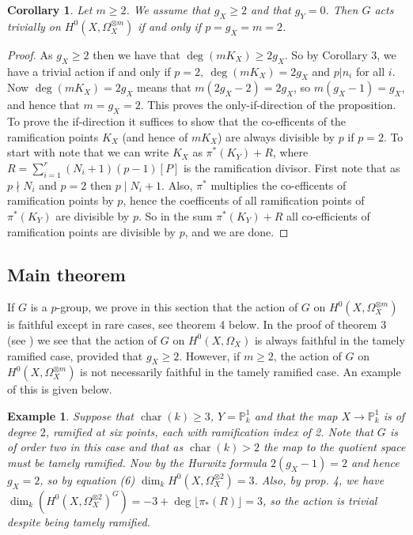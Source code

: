\documentclass[11pt]{article} %
\newtheorem{cor}{Corollary}
\newtheorem{ex}{Example}
\DeclareMathOperator{\cha}{char}
\begin{document}
\begin{cor}
Let $m\geq 2$. We assume that $g_X\geq 2$ and that $g_Y=0$. Then $G$ acts trivially on $H^0(X,\Omega_X^{\otimes m})$ if 
and only if $p=g_X=m=2$.
\end{cor}
\begin{proof}

As $g_X\geq 2$ then we have that $\deg(mK_X)\geq 2g_X$. So by Corollary 3, we have a trivial action if and only if $p=2,\ \deg(mK_X)=2g_X$ and $p|n_i$ for all $i$. Now $\deg(mK_X)=2g_X$ means that $m(2g_X-2)=2g_X$, so $m(g_X-1)=g_X$, and hence that $m=g_X=2$. This proves the only-if-direction of the proposition. To prove the if-direction it suffices to show that the co-efficents of the ramification points $K_X$ (and hence of $mK_X$) are always divisible by $p$ if $p=2$. To start with note that we can write $K_X$ as $\pi^*(K_Y)+R$, where $R=\sum_{i=1}^r(N_i+1)(p-1)[P]$ is the ramification divisor. First note that as $p\nmid N_i$ and $p=2$ then $p\mid N_i+1$. Also, $\pi^*$ multiplies the co-efficents of ramification points by $p$, hence the coefficents of all ramification points of $\pi^*(K_Y)$ are divisible by $p$. So in the sum $\pi^*(K_Y)+R$ all co-efficients of ramification points are divisible by $p$, and we are done.
\end{proof}

\subsection{Main theorem}

If $G$ is a $p$-group, we prove in this section that the action of $G$ on $H^0(X,\Omega_X^{\otimes m})$ is faithful 
except in rare cases, see theorem 4 below. In the proof of theorem 3 (see \citep{faithfulaction}) we see that the action of 
$G$ on $H^0(X,\Omega_X)$ is always faithful in the tamely ramified case, provided that $g_X\geq2$. However, if $m\geq 2$, 
the action of $G$ on $H^0(X,\Omega_X^{\otimes m})$ is not necessarily faithful in the tamely ramified case. An example of this is given below.\\

\begin{ex}
Suppose that $\cha(k)\geq 3$, $Y=\mathbb{P}^1_k$ and that the map $X\rightarrow \mathbb{P}^1_k$ is of degree $2$, 
ramified at six points, each with ramification index of 2. Note that $G$ is of order two in this case and that as 
$\cha(k)>2$ the map to the quotient space must be tamely ramified. Now by the Hurwitz formula $2(g_X-1)=2$ and 
hence $g_X=2$, so by equation (6) $\dim_kH^0(X,\Omega_X^{\otimes 2})=3$. Also, by prop. 4, we have 
$\dim_k(H^0(X,\Omega_X^{\otimes 2})^G)=-3+\deg\lfloor\pi_*(R)\rfloor=3$, so the action is trivial despite being 
tamely ramified.
\end{ex}
~
\end{document}
